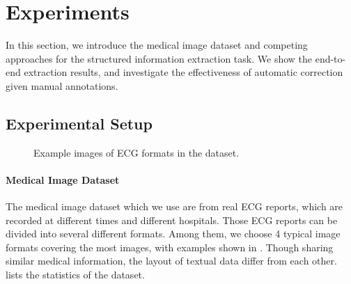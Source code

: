 \section{Experiments}
\label{sec:eval}

In this section, we introduce the medical image dataset and
competing approaches for the structured information extraction task.
We show the end-to-end extraction results,
and investigate the effectiveness of automatic correction
given manual annotations.

\subsection{Experimental Setup}

\begin{figure*}[ht]
\centering
{}
{}
\hfill
{}
\caption{Example images of ECG formats in the dataset.}
\label{fig:dataset}
\end{figure*}

\paragraph{Medical Image Dataset}
The medical image dataset which we use are from real ECG reports,
which are recorded at different times and different hospitals.
Those ECG reports can be divided into several different formats.
Among them, we choose 4 typical image formats covering the most images,
with examples shown in .
Though sharing similar medical information,
the layout of textual data differ from each other.
 lists the statistics of the dataset.

